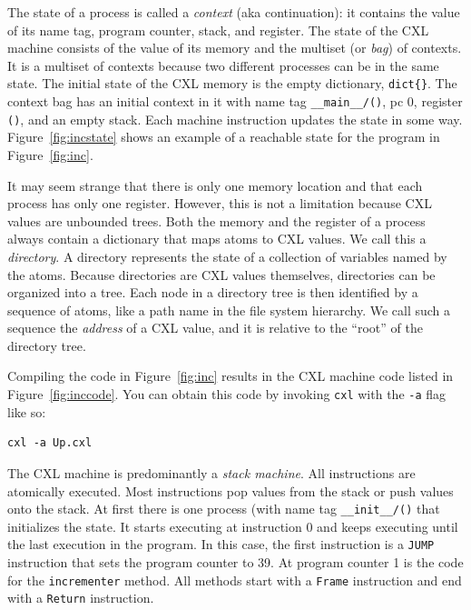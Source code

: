 \documentclass{report}
\newenvironment{code}{
\tcolorbox
}{
\endtcolorbox
}
\begin{document}
The state of a process is called a \emph{context} (aka continuation):
it contains the value of
its name tag, program counter, stack, and register.
The state of the CXL machine
consists of the value of its memory and the multiset (or \emph{bag}) of
contexts.  It is a multiset of contexts because two different processes can
be in the same state.
The initial state of the CXL memory is the empty dictionary, \texttt{dict\{\}}.
The context bag has an initial context in it with name tag
\texttt{\_\_main\_\_/()}, pc 0, register \texttt{()}, and an empty stack.
Each machine instruction updates the state in some way.
Figure~\ref{fig:incstate} shows an example of a reachable state for 
the program in Figure~\ref{fig:inc}.


It may seem strange that there is only one memory location and that each
process has only one register.  However, this is not a limitation because
CXL values are unbounded trees.
Both the memory and the register of a process always contain
a dictionary that maps atoms to CXL values.  We call this a \emph{directory}.
A directory represents the state of a collection of variables named by the atoms.
%
Because directories are CXL values themselves,
directories can be organized into a tree.
Each node in a directory tree is then identified
by a sequence of atoms, like a path name in the file system hierarchy.  We call
such a sequence the \emph{address} of a CXL value, and it is relative to the
``root'' of the directory tree.

Compiling the code in Figure~\ref{fig:inc} results in the CXL machine code
listed in Figure~\ref{fig:inccode}.
You can obtain this code by invoking \texttt{cxl} with the \texttt{-a} flag
like so:
\begin{code}
\begin{verbatim}
cxl -a Up.cxl
\end{verbatim}
\end{code}
The CXL machine is predominantly a \emph{stack machine}.
All instructions are atomically executed.
Most instructions pop values from the stack or push values onto the stack.
At first there is one process (with name tag \texttt{\_\_init\_\_/()}
that initializes the state.
It starts executing at instruction 0 and keeps executing until the last
execution in the program.
In this case, the first instruction is a \texttt{JUMP} instruction that sets the
program counter to 39.
At program counter 1 is the code for the \texttt{incrementer} method.
All methods start with a \texttt{Frame} instruction and end with a \texttt{Return}
instruction.
\end{document}

